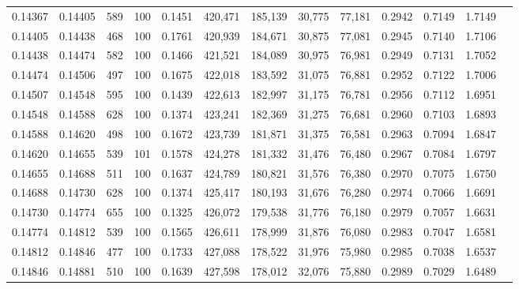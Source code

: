 \begin{tabular}{rrrrrrrrrrrrr}
0.14367 & 0.14405 &   589 & 100 &                                     0.1451 & 420,471 & 185,139 &  30,775 &  77,181 & 0.2942 & 0.7149 & 1.7149 \\
0.14405 & 0.14438 &   468 & 100 &                                     0.1761 & 420,939 & 184,671 &  30,875 &  77,081 & 0.2945 & 0.7140 & 1.7106 \\
0.14438 & 0.14474 &   582 & 100 &                                     0.1466 & 421,521 & 184,089 &  30,975 &  76,981 & 0.2949 & 0.7131 & 1.7052 \\
0.14474 & 0.14506 &   497 & 100 &                                     0.1675 & 422,018 & 183,592 &  31,075 &  76,881 & 0.2952 & 0.7122 & 1.7006 \\
0.14507 & 0.14548 &   595 & 100 &                                     0.1439 & 422,613 & 182,997 &  31,175 &  76,781 & 0.2956 & 0.7112 & 1.6951 \\
0.14548 & 0.14588 &   628 & 100 &                                     0.1374 & 423,241 & 182,369 &  31,275 &  76,681 & 0.2960 & 0.7103 & 1.6893 \\
0.14588 & 0.14620 &   498 & 100 &                                     0.1672 & 423,739 & 181,871 &  31,375 &  76,581 & 0.2963 & 0.7094 & 1.6847 \\
0.14620 & 0.14655 &   539 & 101 &                                     0.1578 & 424,278 & 181,332 &  31,476 &  76,480 & 0.2967 & 0.7084 & 1.6797 \\
0.14655 & 0.14688 &   511 & 100 &                                     0.1637 & 424,789 & 180,821 &  31,576 &  76,380 & 0.2970 & 0.7075 & 1.6750 \\
0.14688 & 0.14730 &   628 & 100 &                                     0.1374 & 425,417 & 180,193 &  31,676 &  76,280 & 0.2974 & 0.7066 & 1.6691 \\
0.14730 & 0.14774 &   655 & 100 &                                     0.1325 & 426,072 & 179,538 &  31,776 &  76,180 & 0.2979 & 0.7057 & 1.6631 \\
0.14774 & 0.14812 &   539 & 100 &                                     0.1565 & 426,611 & 178,999 &  31,876 &  76,080 & 0.2983 & 0.7047 & 1.6581 \\
0.14812 & 0.14846 &   477 & 100 &                                     0.1733 & 427,088 & 178,522 &  31,976 &  75,980 & 0.2985 & 0.7038 & 1.6537 \\
0.14846 & 0.14881 &   510 & 100 &                                     0.1639 & 427,598 & 178,012 &  32,076 &  75,880 & 0.2989 & 0.7029 & 1.6489 \\

\end{tabular}
